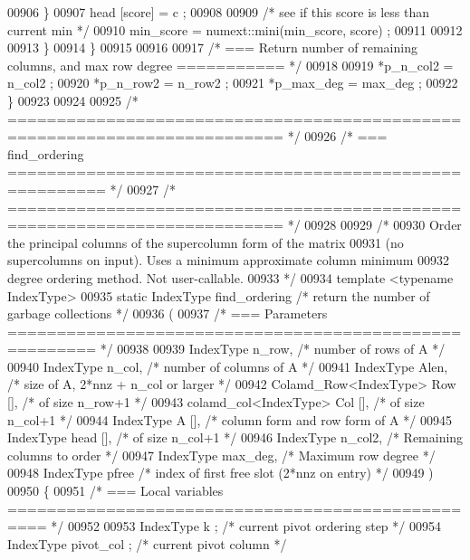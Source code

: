 \begin{DoxyCode}
{{{{{{{{{{{{{{{{{00906       \}
00907       head [score] = c ;
00908 
00909       \textcolor{comment}{/* see if this score is less than current min */}
00910       min\_score = numext::mini(min\_score, score) ;
00911 
00912 
00913     \}
00914   \}
00915 
00916 
00917   \textcolor{comment}{/* === Return number of remaining columns, and max row degree =========== */}
00918 
00919   *p\_n\_col2 = n\_col2 ;
00920   *p\_n\_row2 = n\_row2 ;
00921   *p\_max\_deg = max\_deg ;
00922 \}
00923 
00924 
00925 \textcolor{comment}{/* ========================================================================== */}
00926 \textcolor{comment}{/* === find\_ordering ======================================================== */}
00927 \textcolor{comment}{/* ========================================================================== */}
00928 
00929 \textcolor{comment}{/*}
00930 \textcolor{comment}{  Order the principal columns of the supercolumn form of the matrix}
00931 \textcolor{comment}{  (no supercolumns on input).  Uses a minimum approximate column minimum}
00932 \textcolor{comment}{  degree ordering method.  Not user-callable.}
00933 \textcolor{comment}{*/}
00934 \textcolor{keyword}{template} <\textcolor{keyword}{typename} IndexType>
00935 \textcolor{keyword}{static} IndexType find\_ordering \textcolor{comment}{/* return the number of garbage collections */}
00936   (
00937     \textcolor{comment}{/* === Parameters ======================================================= */}
00938 
00939     IndexType n\_row,      \textcolor{comment}{/* number of rows of A */}
00940     IndexType n\_col,      \textcolor{comment}{/* number of columns of A */}
00941     IndexType Alen,     \textcolor{comment}{/* size of A, 2*nnz + n\_col or larger */}
00942     Colamd\_Row<IndexType> Row [],    \textcolor{comment}{/* of size n\_row+1 */}
00943     colamd\_col<IndexType> Col [],    \textcolor{comment}{/* of size n\_col+1 */}
00944     IndexType A [],     \textcolor{comment}{/* column form and row form of A */}
00945     IndexType head [],    \textcolor{comment}{/* of size n\_col+1 */}
00946     IndexType n\_col2,     \textcolor{comment}{/* Remaining columns to order */}
00947     IndexType max\_deg,    \textcolor{comment}{/* Maximum row degree */}
00948     IndexType pfree     \textcolor{comment}{/* index of first free slot (2*nnz on entry) */}
00949     )
00950 \{
00951   \textcolor{comment}{/* === Local variables ================================================== */}
00952 
00953   IndexType k ;     \textcolor{comment}{/* current pivot ordering step */}
00954   IndexType pivot\_col ;   \textcolor{comment}{/* current pivot column */}
}}}}}}}}}}}}}}}}}
\end{DoxyCode}
